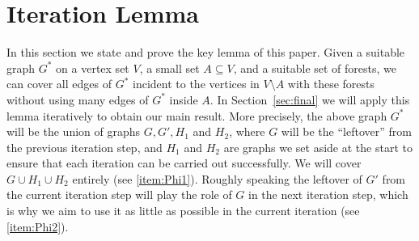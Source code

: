 \documentclass[a4paper, 11pt, reqno]{amsart}
\numberwithin{equation}{section}
\newcommand{\1}{{\rm 1\hspace*{-0.4ex}%
\rule{0.1ex}{1.52ex}\hspace*{0.2ex}}}
\newcommand{\sm}{\setminus}
\newcommand{\sub}{\subseteq}
\newcounter{step}
\begin{document}
\section{Iteration Lemma}
\label{sec:iteration}
In this section we state and prove the key lemma of this paper.
Given a suitable graph $G^*$ on a vertex set $V$, 
a small set $A\sub V$, and a suitable set of forests,
we can cover all edges of $G^*$ incident to the vertices in $V\sm A$ with these forests without using many edges of $G^*$ inside $A$.
In Section~\ref{sec:final} we will apply this lemma iteratively to obtain our main result. More precisely, the above graph $G^*$ will be the union of graphs $G, G', H_1$ and $H_2$, where $G$ will be the ``leftover'' from the previous iteration step, and $H_1$ and $H_2$ are graphs we set aside at the start to ensure that each iteration can be carried out successfully. We will cover $G\cup H_1\cup H_2$ entirely (see \ref{item:Phi1}). Roughly speaking the leftover of $G'$ from the current iteration step will play the role of $G$ in the next iteration step, which is why we aim to use it as little as possible in the current iteration (see \ref{item:Phi2}).
\end{document}
